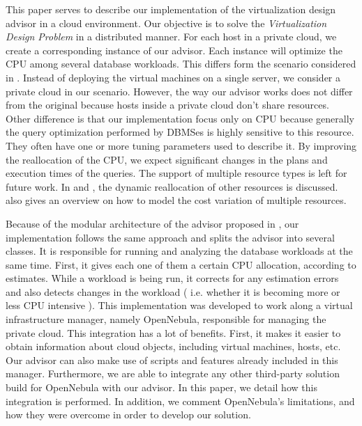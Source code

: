This paper serves to describe our implementation of the virtualization design advisor in a cloud environment. Our objective is to solve the \textit{Virtualization Design Problem} in a distributed manner. For each host in a private cloud, we create a corresponding instance of our advisor. Each instance will optimize the CPU among several database workloads. This differs form the scenario considered in \cite{Soror:2008:AVM:1376616.1376711}. Instead of deploying the virtual machines on a single server, we consider a private cloud in our scenario. However, the way our advisor works does not differ from the original because hosts inside a private cloud don't share resources. Other difference is that our implementation focus only on CPU because  generally the query optimization performed by DBMSes is highly sensitive to this resource. They often have one or more tuning parameters used to describe it. By improving the reallocation of the CPU, we expect significant changes in the plans and execution times of the queries. The support of multiple resource types is left for future work. In \cite{Storm:2006:ASM:1182635.1164220} and \cite{springerlink:10.1007/3-540-44469-6_9}, the dynamic reallocation of other resources is discussed. \cite{Soror:2008:AVM:1376616.1376711} also gives an overview on how to model the cost variation of multiple resources.



Because of the modular architecture of the advisor proposed in \cite{Soror:2008:AVM:1376616.1376711}, our implementation follows the same approach and splits the advisor into several classes. It is responsible for running and analyzing the database workloads  at the same time. First, it gives each one of them a certain CPU allocation, according to estimates. While a workload is being run, it corrects for any estimation errors and also detects changes in the workload ( i.e. whether it is becoming more or less CPU intensive ). This implementation was developed to work along a virtual infrastructure manager, namely OpenNebula, responsible for managing the private cloud. This integration has a lot of benefits. First, it makes it easier to obtain information about cloud objects, including virtual machines, hosts, etc. Our advisor can also make use of scripts and features already included in this manager. Furthermore, we are able to integrate any other third-party solution build for OpenNebula with our advisor. In this paper, we detail how this integration is performed. In addition, we comment OpenNebula's limitations, and how they were overcome in order to develop our solution.

